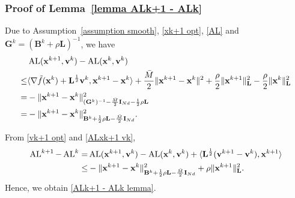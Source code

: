 \documentclass[12pt,draftcls,onecolumn]{IEEEtran}
\begin{document}
\subsubsection{Proof of Lemma~\ref{lemma ALk+1 - ALk}}\label{proof lemma ALk+1 - ALk}
Due to Assumption~\ref{assumption smooth}, \eqref{xk+1 opt}, \eqref{AL} and $\mathbf{G}^k=(\mathbf{B}^k+\rho \mathbf{L})^{-1}$, we have
\begin{align}
	& \operatorname{AL}(\mathbf{x}^{k+1},\mathbf{v}^{k})-\operatorname{AL}(\mathbf{x}^{k},\mathbf{v}^{k})\notag\\
	{\leq}& \langle \nabla \tilde{f}(\mathbf{x}^k)+\mathbf{L}^{\frac{1}{2}}\mathbf{v}^k,\mathbf{x}^{k+1}-\mathbf{x}^k \rangle + \frac{\bar{M}}{2}\|\mathbf{x}^{k+1}-\mathbf{x}^k\|^2  + \frac{\rho}{2}\|\mathbf{x}^{k+1}\|^2_\mathbf{L} - \frac{\rho}{2}\|\mathbf{x}^{k}\|^2_\mathbf{L} \notag\\
	=& -\|\mathbf{x}^{k+1}-\mathbf{x}^k\|^2_{(\mathbf{G}^k)^{-1}-\frac{\bar{M}}{2}\mathbf{I}_{Nd}-\frac{1}{2}\rho \mathbf{L}}\notag\\
	=& -\|\mathbf{x}^{k+1}-\mathbf{x}^k\|^2_{\mathbf{B}^k+\frac{1}{2}\rho \mathbf{L}-\frac{\bar{M}}{2}\mathbf{I}_{Nd}}. \label{ALxk+1 vk}
\end{align}

From \eqref{vk+1 opt} and \eqref{ALxk+1 vk},
\vspace{-0.2cm}
\begin{align*}
	\operatorname{AL}^{k+1} - \operatorname{AL}^k =
    & \operatorname{AL}(\mathbf{x}^{k+1},\mathbf{v}^{k})-\operatorname{AL}(\mathbf{x}^{k},\mathbf{v}^{k}) + \langle \mathbf{L}^{\frac{1}{2}}(\mathbf{v}^{k+1}-\mathbf{v}^k),\mathbf{x}^{k+1}\rangle \notag\\
	{\leq} & -\|\mathbf{x}^{k+1}-\mathbf{x}^{k}\|^2_{\mathbf{B}^k+\frac{1}{2}\rho \mathbf{L} -\frac{\bar{M}}{2}\mathbf{I}_{Nd}} + \rho\|\mathbf{x}^{k+1}\|^2_\mathbf{L} .
\end{align*}
Hence, we obtain \eqref{ALk+1 - ALk lemma}.
\end{document}
